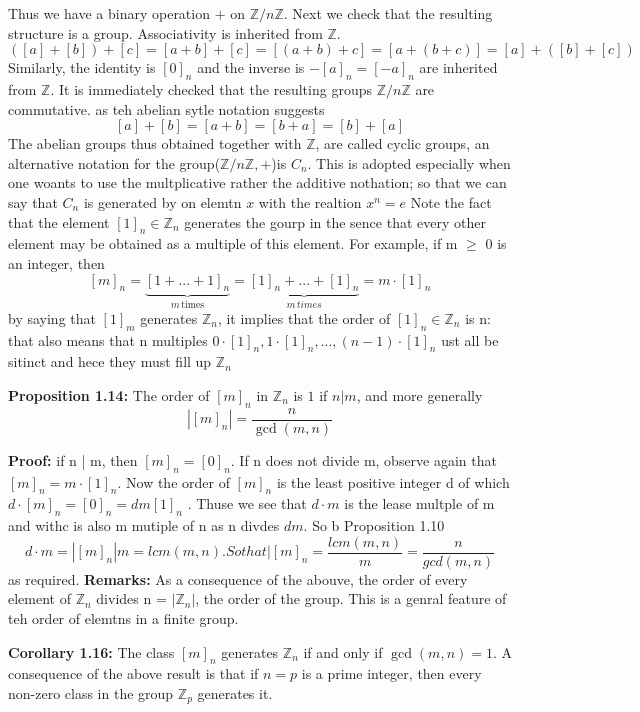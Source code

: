 Thus we have a binary operation $+$ on $\mathbb{Z}/n\mathbb{Z}$. Next we check that the resulting structure is a group. Associativity is inherited from $\mathbb{Z}$.
$$([a]+[b])+[c] = [a+b]+[c] = [(a+b)+c] = [a+(b+c)]= [a]+([b]+[c])$$
 Similarly, the identity is $[0]_n$ and the inverse is $-[a]_n = [-a]_n$ are inherited from $\mathbb{Z}$. It is immediately checked that the resulting groups $\mathbb{Z}/n\mathbb{Z}$ are commutative. as teh abelian sytle notation suggests
 $$[a]+[b] = [a+b] = [b+a] = [b]+[a]$$
 The abelian groups thus obtained together with $\mathbb{Z}$, are called cyclic groups, an alternative notation for the group($\mathbb{Z}/n\mathbb{Z}, +$)is $C_n$.
 This is adopted especially when one woants to use the multplicative rather the additive nothation; so that we can say that $C_n$ is generated by on elemtn $x$ with the realtion $x^n = e$
 Note the fact that the element $[1]_n \in \mathbb{Z}_n$ generates the gourp in the sence that every other element may be obtained as a multiple of this element. For example, if m $\ge$ 0 is an integer, then
 $$[m]_n = \underbrace{[1+...+1]_n}_{m \, \text{times}} = \underbrace{[1]_n + ... + [1]_n}_{m \, times} = m \cdot [1]_n$$
 by saying that $[1]_m$ generates $\mathbb{Z}_n$, it implies that the order of $[1]_n \in \mathbb{Z}_n$ is n: that also means that n multiples $0 \cdot [1]_n, 1 \cdot [1]_n, ...,(n-1) \cdot [1]_n$ ust all be sitinct and hece they must fill up $\mathbb{Z}_n$



\textbf{Proposition 1.14:} The order of $[m]_n$ in $\mathbb{Z}_n$ is $1$ if $n|m$, and more generally
$$ |[m]_n| = \frac{n}{\gcd(m,n)} $$

\textbf{Proof:} if n | m, then $[m]_n = [0]_n$. If n does not divide m, observe again that $[m]_n = m\cdot[1]_n$. Now the order of $[m]_n$ is the least positive integer d of which $d \cdot[m]_n = [0]_n = dm[1]_n$ . Thuse we see that $d \cdot m$ is the lease multple of m and withc is also m mutiple of n as n divdes $dm$. So b Proposition 1.10
$$d\cdot m = |[m]_n|m = lcm(m,n). So that |[m]_n = \frac{lcm(m,n)}{m}= \frac{n}{gcd(m,n)}$$ as required.
\textbf{Remarks:} As a consequence of the abouve, the order of every element of
$\mathbb{Z}_n$ divides n = $|\mathbb{Z}_n|$, the order of the group.
This is a genral feature of teh order of elemtns in a finite group.

\textbf{Corollary 1.16:} The class $[m]_n$ generates $\mathbb{Z}_n$ if and only if $\gcd(m,n) = 1$.
A consequence of the above result is that if $n=p$ is a prime integer, then every non-zero class in the group $\mathbb{Z}_p$ generates it.

